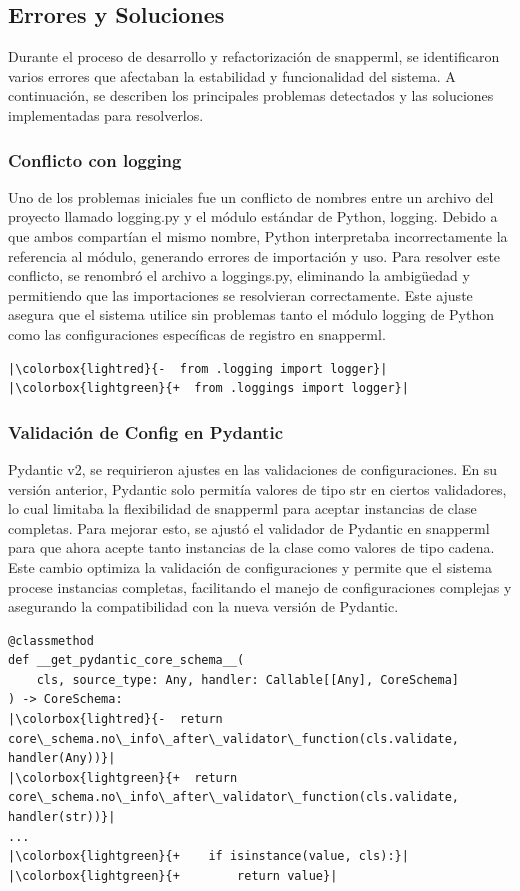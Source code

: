\subsection{Errores y Soluciones}
Durante el proceso de desarrollo y refactorización de \Gls{snapperml}, se identificaron varios errores que afectaban la estabilidad y funcionalidad del sistema. A continuación, se describen los principales problemas detectados y las soluciones implementadas para resolverlos.

\subsubsection{Conflicto con logging}
Uno de los problemas iniciales fue un conflicto de nombres entre un archivo del proyecto llamado logging.py y el módulo estándar de Python, logging. Debido a que ambos compartían el mismo nombre, Python interpretaba incorrectamente la referencia al módulo, generando errores de importación y uso. Para resolver este conflicto, se renombró el archivo a loggings.py, eliminando la ambigüedad y permitiendo que las importaciones se resolvieran correctamente. Este ajuste asegura que el sistema utilice sin problemas tanto el módulo logging de Python como las configuraciones específicas de registro en \Gls{snapperml}.

\begin{verbatim}
|\colorbox{lightred}{-  from .logging import logger}|
|\colorbox{lightgreen}{+  from .loggings import logger}|
\end{verbatim}

\subsubsection{Validación de Config en Pydantic}
Pydantic v2, se requirieron ajustes en las validaciones de configuraciones. En su versión anterior, Pydantic solo permitía valores de tipo str en ciertos validadores, lo cual limitaba la flexibilidad de \Gls{snapperml} para aceptar instancias de clase completas. Para mejorar esto, se ajustó el validador de Pydantic en \Gls{snapperml} para que ahora acepte tanto instancias de la clase como valores de tipo cadena. Este cambio optimiza la validación de configuraciones y permite que el sistema procese instancias completas, facilitando el manejo de configuraciones complejas y asegurando la compatibilidad con la nueva versión de Pydantic.
\begin{verbatim}
@classmethod
def __get_pydantic_core_schema__(
    cls, source_type: Any, handler: Callable[[Any], CoreSchema]
) -> CoreSchema:
|\colorbox{lightred}{-  return core\_schema.no\_info\_after\_validator\_function(cls.validate, handler(Any))}|
|\colorbox{lightgreen}{+  return core\_schema.no\_info\_after\_validator\_function(cls.validate, handler(str))}|
...
|\colorbox{lightgreen}{+    if isinstance(value, cls):}|
|\colorbox{lightgreen}{+        return value}|
    \end{verbatim}
